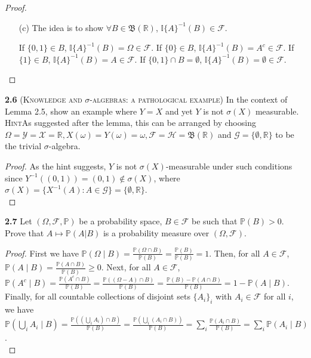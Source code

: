 \begin{proof}
\begin{enumerate}
    We can notice $\mathcal{G} \subseteq \mathcal{H}$.
    Therefore, $\mathcal{H}$ is $\sigma$-algebra that contains $\mathcal{G}$.
    By applying the result from (a), we can have $\sigma(\mathcal{G}) \subseteq \mathcal{H}$, which completes the proof.

    \item[(c)] The idea is to show $\forall B \in \mathfrak{B}(\mathbb{R})$, $\mathbb{I}\{A\}^{-1}(B) \in \mathcal{F}$.

    If $\{0,1\} \in B$, $\mathbb{I}\{A\}^{-1}(B)=\Omega \in \mathcal{F}$. If $\{0\} \in B$, $\mathbb{I}\{A\}^{-1}(B)=A^c \in \mathcal{F}$. If $\{1\} \in B$, $\mathbb{I}\{A\}^{-1}(B)=A \in \mathcal{F}$. If $\{0,1\} \cap B = \emptyset$, $\mathbb{I}\{A\}^{-1}(B)=\emptyset \in \mathcal{F}$.
\end{enumerate}
\end{proof}

\noindent\textbf{2.6}
(\textsc{Knowledge and $\sigma$-algebras: a pathological example}) In the context
of Lemma 2.5, show an example where $Y = X$ and yet $Y$ is not $\sigma(X)$ measurable. \\

\noindent\textsc{Hint}\quad As suggested after the lemma, this can be arranged by choosing $\Omega= \mathcal{Y} = \mathcal{X} = \mathbb{R}, X(\omega) = Y(\omega) = \omega, \mathcal{F} = \mathcal{H} = \mathfrak{B}(\mathbb{R})$
and $\mathcal{G} = \{\emptyset,\mathbb{R}\}$ to be the trivial $\sigma$-algebra.

\begin{proof}
As the hint suggests, $Y$ is not $\sigma(X)$-measurable under such conditions since $Y^{-1}((0, 1))=(0, 1) \notin \sigma(X)$, where $\sigma(X) = \{{X}^{-1}(A): A \in \mathcal{G}\} = \{\emptyset, \mathbb{R}\}$.\\
\end{proof}


\noindent\textbf{2.7}
Let $(\Omega,\mathcal{F},\mathbb{P})$ be a probability space, $B\in\mathcal{F}$ be such that $\mathbb{P}(B) > 0$. Prove that $A \mapsto \mathbb{P}(A|B)$ is a probability measure over $(\Omega,\mathcal{F})$.
\begin{proof}
    First we have $\mathbb{P}(\Omega \mid B) = \frac{\mathbb{P}(\Omega \cap B)}{\mathbb{P}(B)} = \frac{\mathbb{P}(B)}{\mathbb{P}(B)} = 1$. Then, for all $A \in \mathcal{F}$, $\mathbb{P}(A \mid B) = \frac{\mathbb{P}(A \cap B)}{\mathbb{P}(B)} \geq 0$. Next, for all $A \in \mathcal{F}$, $\mathbb{P}(A^c \mid B) = \frac{\mathbb{P}(A^c \cap B)}{\mathbb{P}(B)} = \frac{\mathbb{P}((\Omega - A) \cap B)}{\mathbb{P}(B)} = \frac{\mathbb{P}(B) - \mathbb{P}(A \cap B)}{\mathbb{P}(B)} = 1 - \mathbb{P}(A \mid B)$. Finally, for all countable collections of disjoint sets $\{A_i\}_i$ with $A_i \in \mathcal{F}$ for all $i$, we have $\mathbb{P}\left(\bigcup_{i} A_{i} \mid B\right) = \frac{\mathbb{P}((\bigcup_{i} A_{i}) \cap B)}{\mathbb{P}(B)} = \frac{\mathbb{P}(\bigcup_{i} (A_{i} \cap B))}{\mathbb{P}(B)} = \sum_{i} \frac{\mathbb{P}(A_{i} \cap B)}{\mathbb{P}(B)} = \sum_{i} \mathbb{P}(A_i \mid B)$. \\
\end{proof}

